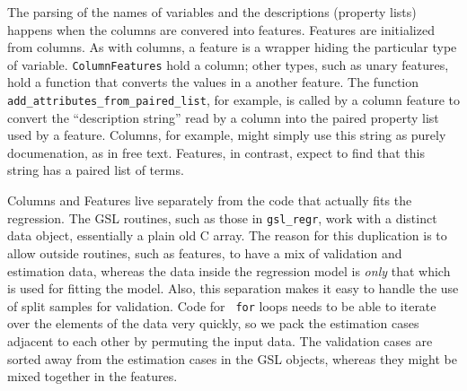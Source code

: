 \documentclass[12pt]{article}
\begin{document}
 The parsing of the names of variables and the descriptions (property lists)
 happens when the columns are convered into features.  Features are initialized
 from columns.  As with columns, a feature is a wrapper hiding the particular
 type of variable.  {\tt ColumnFeatures} hold a column; other types, such as
 unary features, hold a function that converts the values in a another feature.
  The function {\tt add\_attributes\_from\_paired\_list}, for example, is called by
 a column feature to convert the ``description string'' read by a column into
 the paired property list used by a feature.  Columns, for example, might simply
 use this string as purely documenation, as in free text.  Features, in
 contrast, expect to find that this string has a paired list of terms.

 Columns and Features live separately from the code that actually fits the
 regression. The GSL routines, such as those in {\tt gsl\_regr}, work with a
 distinct data object, essentially a plain old C array.  The reason for this
 duplication is to allow outside routines, such as features, to have a mix of
 validation and estimation data, whereas the data inside the regression model is
 {\em only} that which is used for fitting the model.  Also, this separation
 makes it easy to handle the use of split samples for validation. Code for {\tt
 for} loops needs to be able to iterate over the elements of the data very
 quickly, so we pack the estimation cases adjacent to each other by permuting
 the input data.  The validation cases are sorted away from the estimation cases
 in the GSL objects, whereas they might be mixed together in the features.


 
 
\end{document}
